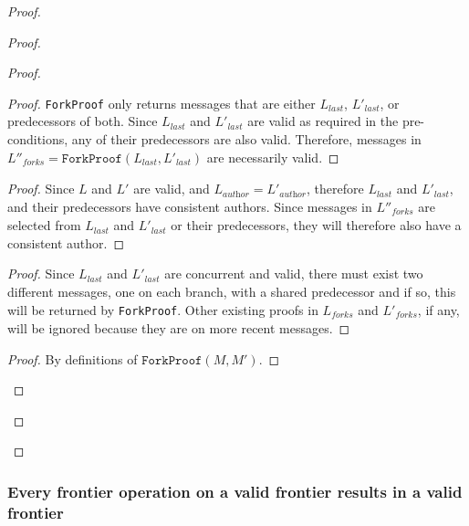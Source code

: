 \documentclass[9pt, oneside]{article}   	%
\begin{document}
\begin{proof}
\begin{proof}
\begin{proof}
			\begin{proof}
				\texttt{ForkProof} only returns messages that are either $L_\textit{last}$, $L'_\textit{last}$, or predecessors of both. Since $L_\textit{last}$ and $L'_\textit{last}$ are valid as required in the pre-conditions, any of their predecessors are also valid. Therefore, messages in $L''_\textit{forks} = \texttt{ForkProof}(L_\textit{last}, L'_\textit{last})$ are necessarily valid.
			\end{proof}
			
			\begin{proof}
				Since $L$ and $L'$ are valid, and $L_\textit{author}=L'_\textit{author}$, therefore $L_\textit{last}$ and $L'_\textit{last}$, and their predecessors have consistent authors. Since messages in $L''_\textit{forks}$ are selected from  $L_\textit{last}$ and $L'_\textit{last}$ or their predecessors, they will therefore also have a consistent author.
			\end{proof}
			
			\begin{proof}
			Since $L_\textit{last}$ and $L'_\textit{last}$ are concurrent and valid, there must exist two different messages, one on each branch, with a shared predecessor and if so, this will be returned by \texttt{ForkProof}. Other existing proofs in $L_\textit{forks}$ and $L'_\textit{forks}$, if any, will be ignored because they are on more recent messages.
			\end{proof}
			
			\begin{proof}
				By definitions of $\texttt{ForkProof}(M,M')$.
			\end{proof}
		\end{proof}
	

	\end{proof}
\end{proof}

\subsubsection{Every frontier operation on a valid frontier results in a valid frontier}
\label{sec:proofs:valid-frontier}
\end{document}
